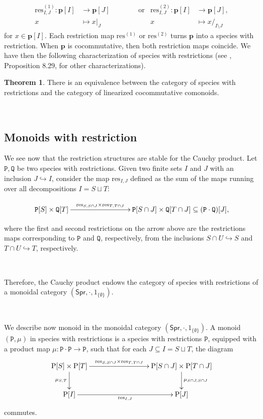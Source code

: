 \documentclass[12pt, reqno]{amsart}
\theoremstyle{definition}
\newtheorem{thm}{Theorem}[section]
\newcommand{\Spr}{\mathsf{Spr}} %
\newcommand{\rP}{\mathrm{P}}
\newcommand{\prP}{\mathtt{P}}
\newcommand{\prQ}{\mathtt{Q}}
\newcommand{\tp}{\mathbf{p}}
\begin{document}
\begin{align*}
\text{res}^{(1)}_{I,J}: \tp[I] &\to \tp[J] \qquad \qquad  \text{or}  &\text{res}^{(2)}_{I,J}: \tp[I] &\to \tp[J],\\
x&\mapsto x|_J \qquad &x&\mapsto x/_{I\setminus J}
\end{align*} 
for $x \in \tp[I]$. Each restriction map $\text{res}^{(1)}$ or $\text{res}^{(2)}$ turns $\tp$ into a species with restriction. When $\tp$ is cocommutative, then both restriction maps coincide. We have then the following characterization of species with restrictions (see \cite{AM2010}, Proposition 8.29, for other characterizations).

\begin{thm}\label{thm:swr_lcc}
There is an equivalence between the category of species with restrictions and the category of linearized cocommutative comonoids.
\end{thm}

\

\subsection{Monoids with restriction}
We see now that the restriction structures are stable for the Cauchy product.
Let $\prP, \prQ$ be two species with restrictions.
Given two finite sets $I$ and $J$ with an inclusion $J \hookrightarrow I$, consider the map $\text{res}_{I,J}$ defined as the sum of the maps running over all decompositions $I=S\sqcup T$:

\[\xymatrix{
\prP[S]\times \prQ[T] \ar[rrr]^-{\text{res}_{S, S\cap J} \times \text{res}_{T, T\cap J}}&&& \prP[S\cap J]\times \prQ[T\cap J] \subseteq (\prP \cdot \prQ)[J],
}\]

where the first and second restrictions on the arrow above are the restrictions maps corresponding to $\prP$ and $\prQ$, respectively, from the inclusions $S \cap U \hookrightarrow S$ and $T \cap U \hookrightarrow T$, respectively. 

\

Therefore, the Cauchy product endows the category of species with restrictions of a monoidal category $(\Spr, \cdot, \mathrm{1}_{\{\emptyset\}})$.

\

We describe now monoid in the monoidal category $(\Spr, \cdot, \mathrm{1}_{\{\emptyset \} })$. A monoid $(\prP, \mu)$ in species with restrictions is a species with restrictions $\prP$, equipped with a product map $\mu: \prP \cdot \prP \to \prP$, such that for each $J \subseteq I=S\sqcup T$, the diagram
\[\xymatrix{
\rP[S]\times \rP[T]\ar[d]_-{\mu_{S,T}} \ar[rrr]^-{\text{res}_{S, S\cap J} \times \text{res}_{T, T\cap J}}&&&\rP[S \cap J]\times \rP[T\cap J]\ar[d]^-{\mu_{S \cap J, S\cap J}}\\
\rP[I]\ar[rrr]_-{\text{res}_{I,J}}&&& \rP[J]
}\]
commutes.
\end{document}
